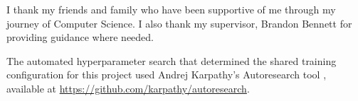 I thank my friends and family who have been supportive of me through my journey of Computer Science. I also thank my supervisor, Brandon Bennett for providing guidance where needed.

\vspace{1cm}

The automated hyperparameter search that determined the shared training configuration for this project used Andrej Karpathy's Autoresearch tool \citep{karpathy2024autoresearch}, available at \url{https://github.com/karpathy/autoresearch}.

